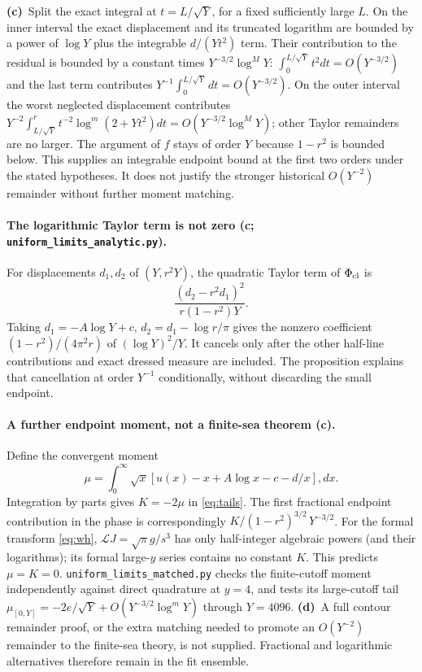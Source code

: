 \documentclass[11pt,a4paper]{article}
\newcommand{\C}{\textbf{(c)}\ }
\newcommand{\D}{\textbf{(d)}\ }
\newcommand{\scr}[1]{\texttt{uniform\_\allowbreak limits\_\allowbreak #1.py}}
\begin{document}
\C Split the exact integral at $t=L/\sqrt Y$, for a fixed sufficiently large
$L$. On the inner interval the exact displacement and its truncated logarithm
are bounded by a power of $\log Y$ plus the integrable $d/(Yt^2)$ term.
Their contribution to the residual is bounded by a constant times
$Y^{-3/2}\log^M Y$: $\int_0^{L/\sqrt Y}t^2dt=O(Y^{-3/2})$ and the last
term contributes $Y^{-1}\int_0^{L/\sqrt Y}dt=O(Y^{-3/2})$.
On the outer interval the worst neglected displacement contributes
$Y^{-2}\int_{L/\sqrt Y}^r t^{-2}\log^m(2+Yt^2)dt
=O(Y^{-3/2}\log^M Y)$; other Taylor remainders are no larger.
The argument of $f$ stays of order $Y$ because $1-r^2$ is bounded below.
This supplies an integrable endpoint bound at the first two orders under the
stated hypotheses. It does not justify the stronger historical
$O(Y^{-2})$ remainder without further moment matching.

\paragraph{The logarithmic Taylor term is not zero (c; \scr{analytic}).}
For displacements $d_1,d_2$ of $(Y,r^2Y)$, the quadratic Taylor term of
$\Phi_{\rm cl}$ is
\begin{equation}
 \frac{(d_2-r^2d_1)^2}{r(1-r^2)Y}.
\end{equation}
Taking $d_1=-A\log Y+c$, $d_2=d_1-\log r/\pi$ gives the nonzero coefficient
$(1-r^2)/(4\pi^2r)$ of $(\log Y)^2/Y$.
It cancels only after the other half-line contributions and exact dressed
measure are included. The proposition explains that cancellation at order
$Y^{-1}$ conditionally, without discarding the small endpoint.

\paragraph{A further endpoint moment, not a finite-sea theorem (c).}
Define the convergent moment
\begin{equation}
 \mu=\int_0^\infty\sqrt{x}
 [u(x)-x+A\log x-c-d/x],dx.\label{eq:mu}
\end{equation}
Integration by parts gives $K=-2\mu$ in \eqref{eq:tails}.
The first fractional endpoint contribution in the phase is correspondingly
$K/(1-r^2)^{3/2}\,Y^{-3/2}$.
For the formal transform \eqref{eq:wh}, $\mathcal LJ=\sqrt\pi g/s^3$
has only half-integer algebraic powers (and their logarithms); its formal
large-$y$ series contains no constant $K$. This predicts $\mu=K=0$.
\scr{matched} checks the finite-cutoff moment independently against direct
quadrature at $y=4$, and tests its large-cutoff tail
$\mu_{[0,Y]}=-2e/\sqrt Y+O(Y^{-3/2}\log^mY)$ through $Y=4096$.
\D A full contour remainder proof, or the extra matching needed to promote
an $O(Y^{-2})$ remainder to the finite-sea theory, is not supplied.
Fractional and logarithmic alternatives therefore remain in the fit ensemble.
\end{document}
